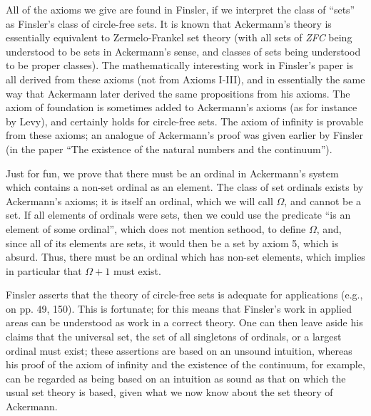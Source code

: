 All of the axioms we give are found in Finsler, if we interpret the
class of ``sets'' as Finsler's class of circle-free sets. It is known
that Ackermann's theory is essentially equivalent to Zermelo-Frankel
set theory (with all sets of {\em ZFC\/} being understood to be sets
in Ackermann's sense, and classes of sets being understood to be
proper classes).  The mathematically interesting work in Finsler's
paper is all derived from these axioms (not from Axioms I-III), and in
essentially the same way that Ackermann later derived the same
propositions from his axioms.  The axiom of foundation is sometimes
added to Ackermann's axioms (as for instance by Levy), and certainly
holds for circle-free sets.  The axiom of infinity is provable from
these axioms; an analogue of Ackermann's proof was given earlier by
Finsler (in the paper ``The existence of the natural numbers and the
continuum'').

Just for fun, we prove that there must be an ordinal in Ackermann's
system which contains a non-set ordinal as an element.  The class of
set ordinals exists by Ackermann's axioms; it is itself an ordinal,
which we will call $\Omega$, and cannot be a set.  If all elements of
ordinals were sets, then we could use the predicate ``is an element of
some ordinal'', which does not mention sethood, to define $\Omega$,
and, since all of its elements are sets, it would then be a set by
axiom 5, which is absurd.  Thus, there must be an ordinal which has
non-set elements, which implies in particular that $\Omega+1$ must
exist.

Finsler asserts that the theory of circle-free sets is adequate for
applications (e.g., on pp. 49, 150).  This is fortunate; for this
means that Finsler's work in applied areas can be understood as work
in a correct theory.  One can then leave aside his claims that the
universal set, the set of all singletons of ordinals, or a largest
ordinal must exist; these assertions are based on an unsound
intuition, whereas his proof of the axiom of infinity and the
existence of the continuum, for example, can be regarded as being
based on an intuition as sound as that on which the usual set theory
is based, given what we now know about the set theory of Ackermann.

